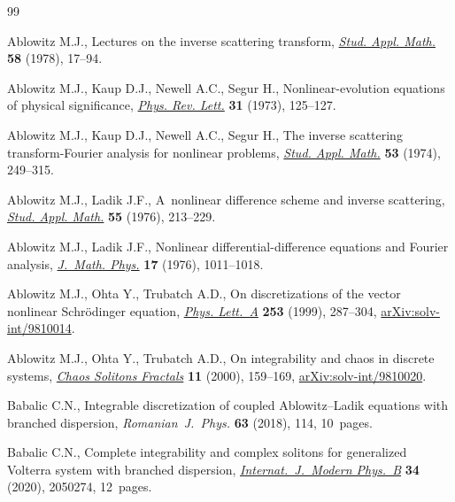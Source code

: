\documentclass[10pt,a4paper]{amsart}
\numberwithin{equation}{section}
\begin{document}
\begin{thebibliography}{99}
\footnotesize\itemsep=0pt

Ablowitz M.J., Lectures on the inverse scattering transform,
 \href{https://doi.org/10.1002/sapm197858117}{\textit{Stud. Appl.
 Math.}} \textbf{58} (1978), 17--94.

Ablowitz M.J., Kaup D.J., Newell A.C., Segur H., Nonlinear-evolution equations
 of physical significance,
 \href{https://doi.org/10.1103/PhysRevLett.31.125}{\textit{Phys. Rev. Lett.}}
 \textbf{31} (1973), 125--127.

Ablowitz M.J., Kaup D.J., Newell A.C., Segur H., The inverse scattering
 transform-{F}ourier analysis for nonlinear problems,
 \href{https://doi.org/10.1002/sapm1974534249}{\textit{Stud. Appl. Math.}}
 \textbf{53} (1974), 249--315.

Ablowitz M.J., Ladik J.F., A~nonlinear difference scheme and inverse
 scattering, \href{https://doi.org/10.1002/sapm1976553213}{\textit{Stud. Appl.
 Math.}} \textbf{55} (1976), 213--229.

Ablowitz M.J., Ladik J.F., Nonlinear differential-difference equations and
 {F}ourier analysis, \href{https://doi.org/10.1063/1.523009}{\textit{J.~Math.
 Phys.}} \textbf{17} (1976), 1011--1018.

Ablowitz M.J., Ohta Y., Trubatch A.D., On discretizations of the vector
 nonlinear {S}chr\"odinger equation,
 \href{https://doi.org/10.1016/S0375-9601(99)00048-1}{\textit{Phys. Lett.~A}}
 \textbf{253} (1999), 287--304,
 \href{http://arxiv.org/abs/solv-int/9810014}{arXiv:solv-int/9810014}.

Ablowitz M.J., Ohta Y., Trubatch A.D., On integrability and chaos in discrete
 systems, \href{https://doi.org/10.1016/S0960-0779(98)00280-X}{\textit{Chaos
 Solitons Fractals}} \textbf{11} (2000), 159--169,
 \href{http://arxiv.org/abs/solv-int/9810020}{arXiv:solv-int/9810020}.

Babalic C.N., Integrable discretization of coupled {A}blowitz--{L}adik
 equations with branched dispersion, \textit{Romanian~J.~Phys.} \textbf{63}
 (2018), 114, 10~pages.

Babalic C.N., Complete integrability and complex solitons for generalized
 {V}olterra system with branched dispersion,
 \href{https://doi.org/10.1142/S0217979220502744}{\textit{Internat.~J.~Modern
 Phys.~B}} \textbf{34} (2020), 2050274, 12~pages.


\end{thebibliography}
\end{document}
